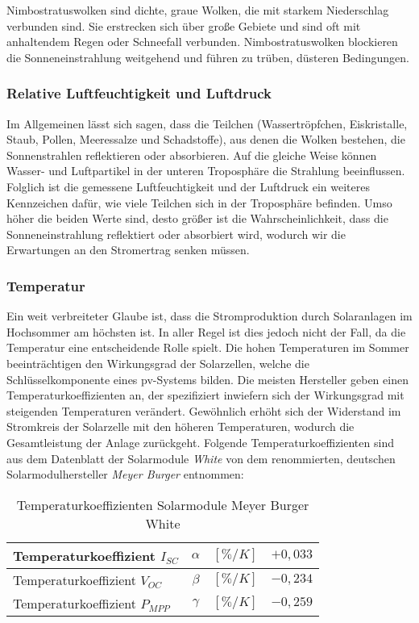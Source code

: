 \documentclass[12pt, a4paper]{article}
\begin{document}
Nimbostratuswolken sind dichte, graue Wolken, die mit starkem Niederschlag verbunden sind. Sie erstrecken sich über große Gebiete und sind oft mit anhaltendem Regen oder Schneefall verbunden. Nimbostratuswolken blockieren die Sonneneinstrahlung weitgehend und führen zu trüben, düsteren Bedingungen.

\subsubsection{Relative Luftfeuchtigkeit und Luftdruck}

Im Allgemeinen lässt sich sagen, dass die Teilchen (Wassertröpfchen, Eiskristalle, Staub, Pollen, Meeressalze und Schadstoffe), aus denen die Wolken bestehen, die Sonnenstrahlen reflektieren oder absorbieren. Auf die gleiche Weise können Wasser- und Luftpartikel in der unteren Troposphäre die Strahlung beeinflussen. Folglich ist die gemessene Luftfeuchtigkeit und der Luftdruck ein weiteres Kennzeichen dafür, wie viele Teilchen sich in der Troposphäre befinden. Umso höher die beiden Werte sind, desto größer ist die Wahrscheinlichkeit, dass die Sonneneinstrahlung reflektiert oder absorbiert wird, wodurch wir die Erwartungen an den Stromertrag senken müssen. 

\subsubsection{Temperatur}

Ein weit verbreiteter Glaube ist, dass die Stromproduktion durch Solaranlagen im Hochsommer am höchsten ist. In aller Regel ist dies jedoch nicht der Fall, da die Temperatur eine entscheidende Rolle spielt. Die hohen Temperaturen im Sommer beeinträchtigen den Wirkungsgrad der Solarzellen, welche die Schlüsselkomponente eines \ac{pv}-Systems bilden. Die meisten Hersteller geben einen Temperaturkoeffizienten an, der spezifiziert inwiefern sich der Wirkungsgrad mit steigenden Temperaturen verändert. Gewöhnlich erhöht sich der Widerstand im Stromkreis der Solarzelle mit den höheren Temperaturen, wodurch die Gesamtleistung der Anlage zurückgeht. Folgende Temperaturkoeffizienten sind aus dem Datenblatt der Solarmodule \textit{White} von dem renommierten, deutschen Solarmodulhersteller \textit{Meyer Burger} entnommen: \newline


\begin{table}[h]
\begin{center}
\def\arraystretch{1.5}
\setlength\tabcolsep{0.75cm}
\begin{tabular}{| l | c | r | c |}
\hline
Temperaturkoeffizient $I_{SC}$ &	$\alpha$ & 	$[\%/K]$ &		$+0,033$ \\ \hline
Temperaturkoeffizient $V_{OC}$ & 	$\beta$  &	$[\%/K]$ & 		$-0,234$ \\ \hline
Temperaturkoeffizient $P_{MPP}$ & 	$\gamma$  &	$[\%/K]$ & 		$-0,259$ \\ \hline
\end{tabular}
\end{center}
\caption{Temperaturkoeffizienten Solarmodule Meyer Burger White}
\label{tab:temperaturkoeffizienten} 
\end{table}
\end{document}
